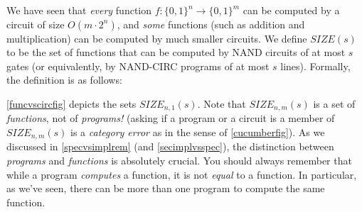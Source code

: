 We have seen that \emph{every} function
\(f:\{0,1\}^n \rightarrow \{0,1\}^m\) can be computed by a circuit of
size \(O(m\cdot 2^n)\), and \emph{some} functions (such as addition and
multiplication) can be computed by much smaller circuits. We define
\(\ensuremath{\mathit{SIZE}}(s)\) to be the set of functions that can be
computed by NAND circuits of at most \(s\) gates (or equivalently, by
NAND-CIRC programs of at most \(s\) lines). Formally, the definition is
as follows:

\hypertarget{sizedef}{}

\cref{funcvscircfig} depicts the sets
\(\ensuremath{\mathit{SIZE}}_{n,1}(s)\). Note that
\(\ensuremath{\mathit{SIZE}}_{n,m}(s)\) is a set of \emph{functions},
not of \emph{programs!} (asking if a program or a circuit is a member of
\(\ensuremath{\mathit{SIZE}}_{n,m}(s)\) is a \emph{category error} as in
the sense of \cref{cucumberfig}). As we discussed in
\cref{specvsimplrem} (and \cref{secimplvsspec}), the distinction between
\emph{programs} and \emph{functions} is absolutely crucial. You should
always remember that while a program \emph{computes} a function, it is
not \emph{equal} to a function. In particular, as we've seen, there can
be more than one program to compute the same function.


